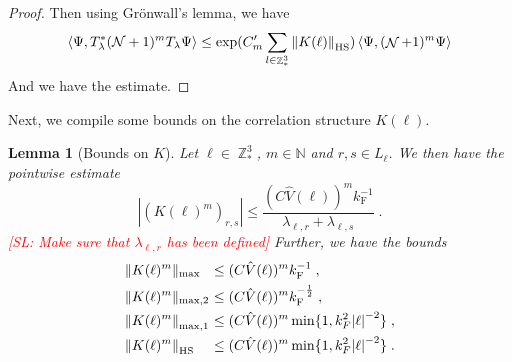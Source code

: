 \documentclass[sn-mathphys, Numbered ,a4paper]{sn-jnl}%
\DeclareMathOperator{\Z}{\mathbb{Z}}
\DeclareMathOperator{\NN}{\mathcal{N}}
\newcommand{\eva}[1]{\left\langle #1 \right\rangle}
\newcommand{\F}{\mathrm{F}}
\newcommand{\normmaxi}[1]{\norm{#1}_{\mathrm{max,1}}}
\theoremstyle{plain}
\newtheorem{lemma}[theorem]{Lemma}
\theoremstyle{definition}
\theoremstyle{remark}
\theoremstyle{plain}
\theoremstyle{definition}
\theoremstyle{remark}
\begin{document}
\begin{proof}
\begin{comment}
        &\leq 4 \sum\limits_{\ell \in \Z^3_*} \norm{K(\ell)}_{\mathrm{HS}} \eva{\Psi,T^*_\lambda(\NN+1)T_\lambda\Psi}
    \end{align}
\end{comment}
    Then using Gr\"onwall's lemma, we have
    \begin{equation}
        \eva{\Psi, T^*_{\lambda}(\mathcal{N} +1)^m T_{\lambda} \Psi } \leq \mathrm{exp}(C'_m\sum\limits_{l\in \Z^3_*} \norm{K(\ell)}_{\mathrm{HS}}) \eva{\Psi, (\NN+1)^m\Psi}
    \end{equation}
    And we have the estimate.
\end{proof}

Next, we compile some bounds on the correlation structure $ K(\ell) $.
\begin{lemma}[Bounds on $ K $]\label{lem:normsk}
	Let $ \ell \in \Z^3_* $, $ m \in \mathbb{N} $ and $ r,s \in L_\ell $. We then have the pointwise estimate
	\begin{equation} \label{eq:K_element_bounds}
		|(K(\ell)^m)_{r,s}|
		\le \frac{(C \hat{V}(\ell))^m k_{\F}^{-1}}{\lambda_{\ell,r} + \lambda_{\ell,s}} \;.
	\end{equation}
\textcolor{red}{[SL: Make sure that $ \lambda_{\ell,r} $ has been defined]} Further, we have the bounds
\begin{equation} \label{eq:K_max_bounds}
\begin{aligned}
	&\Vert K(\ell)^m \Vert_{\mathrm{max}}\!\!\!\!
	&\le\; &(C \hat{V}(\ell))^m k_{\F}^{-1} \;, \\ 
	&\Vert K(\ell)^m \Vert_{\mathrm{max},2}\!\!\!\!
	&\le \;&(C \hat{V}(\ell))^m k_{\F}^{-\frac 12} \;, \\
	&\normmaxi{K(\ell)^m}\!\!\!\!
	&\leq \; &(C \hat{V}(\ell))^m \min\{1,k^2_F\abs{\ell}^{-2}\} \;,\\
	&\norm{K(\ell)^m}_{\mathrm{HS}}\!\!\!\!
	&\le \;&(C \hat{V}(\ell))^m \min\{1,k^2_F\abs{\ell}^{-2}\} \;.
\end{aligned}   
\end{equation}
\end{lemma}
\end{document}
